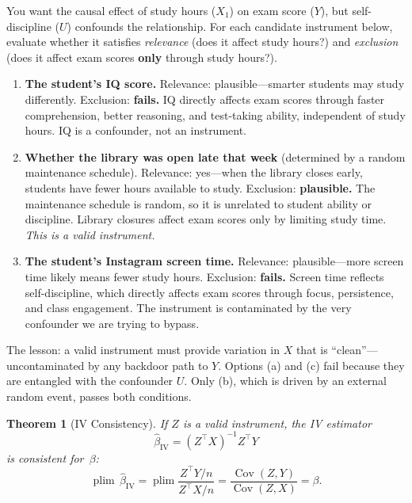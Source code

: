 \documentclass[11pt,a4paper]{article}
\theoremstyle{definition}
\theoremstyle{plain}
\newtheorem{theorem}{Theorem}[section]
\theoremstyle{remark}
\newcommand{\Cov}{\operatorname{Cov}}
\newcommand{\plim}{\operatorname{plim}}
\newcommand{\biv}{\hat{\beta}_{\text{IV}}}
\begin{document}
\begin{tcolorbox}[colback=truthgold!5, colframe=truthgold!80!black, fonttitle=\bfseries, title={Try It Yourself: Name That Instrument}]
You want the causal effect of study hours ($X_1$) on exam score ($Y$), but self-discipline ($U$) confounds the relationship. For each candidate instrument below, evaluate whether it satisfies \emph{relevance} (does it affect study hours?) and \emph{exclusion} (does it affect exam scores \textbf{only} through study hours?).

\begin{enumerate}[label=(\alph*)]
  \item \textbf{The student's IQ score.} Relevance: plausible---smarter students may study differently. Exclusion: \textcolor{biasred}{\textbf{fails.}} IQ directly affects exam scores through faster comprehension, better reasoning, and test-taking ability, independent of study hours. IQ is a confounder, not an instrument.

  \item \textbf{Whether the library was open late that week} (determined by a random maintenance schedule). Relevance: yes---when the library closes early, students have fewer hours available to study. Exclusion: \textcolor{repairgreen}{\textbf{plausible.}} The maintenance schedule is random, so it is unrelated to student ability or discipline. Library closures affect exam scores only by limiting study time. \emph{This is a valid instrument.}

  \item \textbf{The student's Instagram screen time.} Relevance: plausible---more screen time likely means fewer study hours. Exclusion: \textcolor{biasred}{\textbf{fails.}} Screen time reflects self-discipline, which directly affects exam scores through focus, persistence, and class engagement. The instrument is contaminated by the very confounder we are trying to bypass.
\end{enumerate}

The lesson: a valid instrument must provide variation in $X$ that is ``clean''---uncontaminated by any backdoor path to $Y$. Options (a) and (c) fail because they are entangled with the confounder $U$. Only (b), which is driven by an external random event, passes both conditions.
\end{tcolorbox}

\begin{theorem}[IV Consistency]\label{thm:iv}
If $Z$ is a valid instrument, the IV estimator
\begin{equation}\label{eq:iv}
  \biv = (Z^\top X)^{-1} Z^\top Y
\end{equation}
is consistent for~$\beta$:
\[
  \plim\, \biv
  = \plim \frac{Z^\top Y / n}{Z^\top X / n}
  = \frac{\Cov(Z, Y)}{\Cov(Z, X)}
  = \beta.
\]
\end{theorem}
\end{document}
